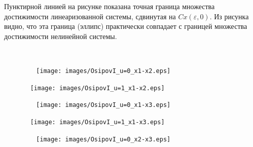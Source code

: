 \documentclass[../main.tex]{subfiles}
\begin{document}
\begin{enumerate}
Пунктирной линией на рисунке показана точная граница множества достижимости линеаризованной системы, сдвинутая на $ Cx(\varepsilon, 0) $. Из рисунка видно, что эта граница (эллипс) практически совпадает с границей множества достижимости нелинейной системы.
    \end{enumerate} 
    
    \begin{figure}[ht!] 
        \hspace{-2.5ex}
        \begin{minipage}[b]{.49\linewidth} 
            \small
            \centering 
            \texttt{[image: images/OsipovI\_u=0\_x1-x2.eps]}
            \label{fig:u=0_x1-x2} 
        \end{minipage}
        \hfill
        \begin{minipage}[b]{.49\linewidth} 
            \small
            \centering
            \texttt{[image: images/OsipovI\_u=1\_x1-x2.eps]}
            \label{fig:u=1_x1-x2}  
        \end{minipage} 
        \vfill
        \hspace{-2.5ex}
        \begin{minipage}[b]{.49\linewidth} 
            \small
            \centering 
            \texttt{[image: images/OsipovI\_u=0\_x1-x3.eps]}
            \label{fig:u=0_x1-x3} 
        \end{minipage}
        \hfill
        \begin{minipage}[b]{.49\linewidth} 
            \small
            \centering
            \texttt{[image: images/OsipovI\_u=1\_x1-x3.eps]}
            \label{fig:u=1_x1-x3}  
        \end{minipage} 
        \vfill
        \hspace{-2.5ex}
        \begin{minipage}[b]{.49\linewidth} 
            \small
            \centering 
            \texttt{[image: images/OsipovI\_u=0\_x2-x3.eps]}

\end{minipage}
\end{figure}
\end{document}

